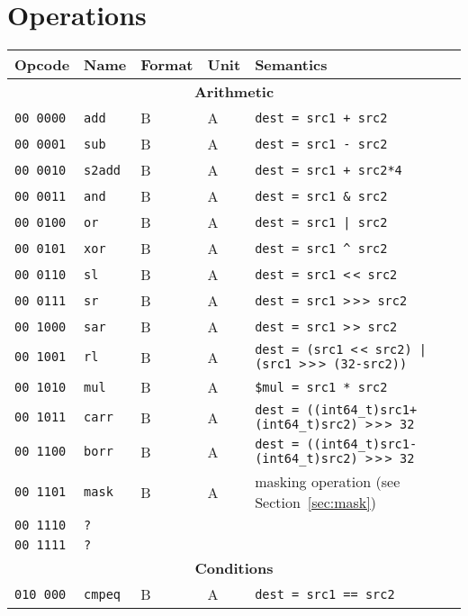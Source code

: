 \documentclass[10pt,a4paper]{article}
\newcommand{\shl}{\textless$\,\!$\textless}
\newcommand{\shr}{\textgreater$\,\!$\textgreater$\,\!$\textgreater}
\newcommand{\ashr}{\textgreater$\,\!$\textgreater}
\begin{document}
\pagebreak

\section{Operations}

\begin{longtable}{llllp{}}
\toprule
Opcode & Name & Format & Unit & Semantics \\
\midrule
\multicolumn{5}{c}{\textbf{Arithmetic}} \\
\cmidrule{1-5}
\texttt{00 0000} & \texttt{add} & B & A & \texttt{dest = src1 + src2} \\
\texttt{00 0001} & \texttt{sub} & B & A & \texttt{dest = src1 - src2} \\
\texttt{00 0010} & \texttt{s2add} & B & A & \texttt{dest = src1 + src2*4} \\
\texttt{00 0011} & \texttt{and} & B & A & \texttt{dest = src1 \& src2} \\
\texttt{00 0100} & \texttt{or} & B & A & \texttt{dest = src1 | src2} \\
\texttt{00 0101} & \texttt{xor} & B & A & \texttt{dest = src1 \textasciicircum{} src2} \\
\texttt{00 0110} & \texttt{sl} & B & A & \texttt{dest = src1 \shl{} src2} \\
\texttt{00 0111} & \texttt{sr} & B & A & \texttt{dest = src1 \shr{} src2} \\
\texttt{00 1000} & \texttt{sar} & B & A & \texttt{dest = src1 \ashr{} src2} \\
\texttt{00 1001} & \texttt{rl} & B & A & \texttt{dest = (src1 \shl{} src2) | (src1 \shr{} (32-src2))} \\
\texttt{00 1010} & \texttt{mul} & B & A & \texttt{\$mul = src1 * src2} \\
\texttt{00 1011} & \texttt{carr} & B & A & \texttt{dest = ((int64\_t)src1+(int64\_t)src2) \shr{} 32} \\
\texttt{00 1100} & \texttt{borr} & B & A & \texttt{dest = ((int64\_t)src1-(int64\_t)src2) \shr{} 32} \\
\texttt{00 1101} & \texttt{mask} & B & A & masking operation (see Section~\ref{sec:mask}) \\
\texttt{00 1110} & \texttt{?} & & & \\
\texttt{00 1111} & \texttt{?} & & & \\
\midrule
\multicolumn{5}{c}{\textbf{Conditions}} \\
\cmidrule{1-5}
\texttt{010 000} & \texttt{cmpeq} & B & A & \texttt{dest = src1 == src2} \\

\end{longtable}
\end{document}
